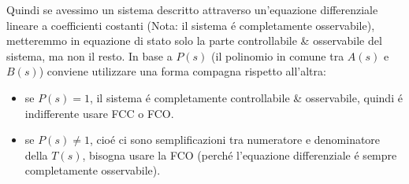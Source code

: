 \documentclass[../main.tex]{subfiles}
\begin{document}
\begin{itemize}
				Quindi se avessimo un sistema descritto attraverso un'equazione differenziale lineare a coefficienti costanti (Nota: il sistema \'e completamente osservabile), metteremmo in equazione di stato solo la parte controllabile \& osservabile del sistema, ma non il resto. In base a $ P(s) $ (il polinomio in comune tra $ A(s) $ e $ B(s) $) conviene utilizzare una forma compagna rispetto all'altra:
				\begin{itemize}
					\item 
						se $ P(s) = 1 $, il sistema \'e completamente controllabile \& osservabile, quindi \'e indifferente usare FCC o FCO.
					\item 
						se $ P(s) \neq 1 $, cio\'e ci sono semplificazioni tra numeratore e denominatore della $ T(s) $, bisogna usare la FCO (perch\'e l'equazione differenziale \'e sempre completamente osservabile).
				\end{itemize}
		\end{itemize}
\end{document}
